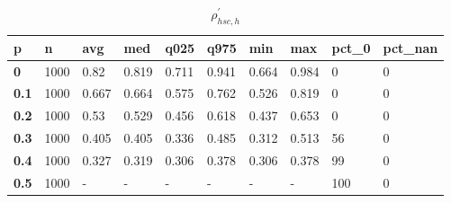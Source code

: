 \begin{table}[h]
 \centering 
\footnotesize
\caption{$\rho_{hsc,h}^\prime $}
\label{tab:alphahsch}
\begin{tabular}[h]{|l|l|l|l|l|l|l|l|l|l|
    } \hline
\textbf{ p} & \textbf{ n} & \textbf{ avg} & \textbf{ med} & \textbf{ q025} & \textbf{ q975} & \textbf{ min} & \textbf{ max} & \textbf{ pct\_0} & \textbf{ pct\_nan}
    \\ \hline
  \textbf{  0} & 1000 &  0.82 & 0.819 & 0.711 & 0.941 & 0.664 & 0.984 &   0 & 0
    \\ \hline
  \textbf{0.1} & 1000 & 0.667 & 0.664 & 0.575 & 0.762 & 0.526 & 0.819 &   0 & 0
    \\ \hline
  \textbf{0.2} & 1000 &  0.53 & 0.529 & 0.456 & 0.618 & 0.437 & 0.653 &   0 & 0
    \\ \hline
  \textbf{0.3} & 1000 & 0.405 & 0.405 & 0.336 & 0.485 & 0.312 & 0.513 &  56 & 0
    \\ \hline
  \textbf{0.4} & 1000 & 0.327 & 0.319 & 0.306 & 0.378 & 0.306 & 0.378 &  99 & 0
    \\ \hline
  \textbf{0.5} & 1000 & - & - & - & - & - & - & 100 & 0
    \\ \hline
 \end{tabular}
 \end{table}

